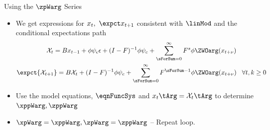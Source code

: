 \documentclass[12pt]{article}
\begin{document}
{Using the $\zpWarg$ Series}
{\small
  \begin{itemize}
  \item We get expressions for $x_t,\,\, \expct x_{t+1}$ consistent with $\linMod$ and the conditional expectations path
   \begin{gather*}
     \mathcal{X}_{t} =B x_{t-1}+ \phi \psi_\epsilon\epsilon + (I - F)^{-1} \phi \psi_c + \sum_{\sForSum=0}^\infty F^s \phi \ZWOarg(x_{t+\nu})\\
	\expct{ \mathcal{X}_{t+1}} =B \mathcal{X}_{t}  + (I - F)^{-1} \phi \psi_c+ \sum_{\sForSum =0}^\infty F^{\sForSum-1} \phi \ZWOarg(x_{t+\nu}) \,\,\,\,\,\forall t,k \ge  0
\end{gather*}
\item Use the model equations, $\eqnFuncSys$ and $x_t\tArg=\mathcal{X}_t\tArg$ to determine $\xppWarg, \zppWarg$
\item $\xpWarg=\xppWarg, \zpWarg=\zppWarg$ -- {\color{blue}Repeat loop.}
  \end{itemize}
}




  


\end{document}

